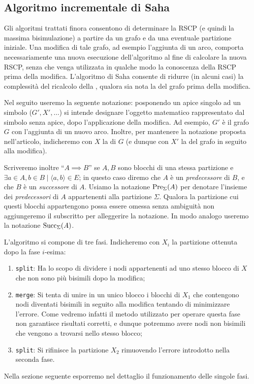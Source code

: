 \subsection{Algoritmo incrementale di Saha}
\label{sec:saha}
Gli algoritmi trattati finora consentono di determinare la RSCP (e quindi la massima bisimulazione) a partire da un grafo e da una eventuale partizione iniziale. Una modifica di tale grafo, ad esempio l'aggiunta di un arco, comporta necessariamente una nuova esecuzione dell'algoritmo al fine di calcolare la nuova RSCP, senza che venga utilizzata in qualche modo la conoscenza della RSCP prima della modifica. L'algoritmo di Saha \cite{saha} consente di ridurre (in alcuni casi) la complessità del ricalcolo della \rscpnomath, qualora sia nota la \rscpnomath del grafo prima della modifica.

Nel seguito useremo la seguente notazione: posponendo un apice singolo ad un simbolo ($G', X', \dots$) si intende designare l'oggetto matematico rappresentato dal simbolo senza apice, dopo l'applicazione della modifica. Ad esempio, $G'$ è il grafo $G$ con l'aggiunta di un nuovo arco. Inoltre, per mantenere la notazione proposta nell'articolo, indicheremo con $X$ la \rscpnomath di $G$ (e dunque con $X'$ la \rscpnomath del grafo in seguito alla modifica).

Scriveremo inoltre ``$A \implies B$'' se $A,B$ sono blocchi di una stessa partizione e $\exists a \in A, b \in B \mid \langle a, b\rangle \in E$; in questo caso diremo che $A$ è un \emph{predecessore} di $B$, e che $B$ è un \emph{successore} di $A$. Usiamo la notazione $\textup{Pre}_{\Sigma}(A)$ per denotare l'insieme dei \emph{predecessori} di $A$ appartenenti alla partizione $\Sigma$. Qualora la partizione cui questi blocchi appartengono possa essere omessa senza ambiguità non aggiungeremo il subscritto per alleggerire la notazione. In modo analogo useremo la notazione $\textup{Succ}_{\Sigma}(A)$.

L'algoritmo si compone di tre fasi. Indicheremo con $X_i$ la partizione ottenuta dopo la fase $i$-esima:
\begin{enumerate}
    \item \texttt{split}: Ha lo scopo di dividere i nodi appartenenti ad uno stesso blocco di $X$ che non sono più bisimili dopo la modifica;
    \item \texttt{merge}: Si tenta di unire in un unico blocco i blocchi di $X_1$ che contengono nodi diventati bisimili in seguito alla modifica tentando di minimizzare l'errore. Come vedremo infatti il metodo utilizzato per operare questa fase non garantisce risultati corretti, e dunque potremmo avere nodi non bisimili che vengono a trovarsi nello stesso blocco;
    \item \texttt{split}: Si rifinisce la partizione $X_2$ rimuovendo l'errore introdotto nella seconda fase.
\end{enumerate}
Nella sezione seguente esporremo nel dettaglio il funzionamento delle singole fasi.

